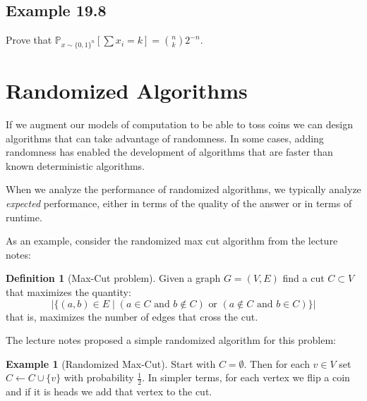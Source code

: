\documentclass[11pt]{article}
\newif\ifsolutions
\theoremstyle{definition}
\newtheorem{defn}[theorem]{Definition}
\newtheorem{example}[theorem]{Example}
\newtheorem*{solution}{Solution}
\begin{document}
\subsection{Example 19.8}
Prove that $\mathbb{P}_{x \sim \{0,1\}^n} [\sum x_i = k] = {{n}\choose{k}} 2^{-n}$.   \\

\ifsolutions
\color{blue}
\begin{solution}
This is simply the probability of getting $k$ heads and $(n-k)$ tails, and since both heads and tails have probability $\frac 1 2$, then we know that this is simply ${{n}\choose{k}} 2^{-n}$.  (There are $\binom n k$ ways to ``choose'' which $k$ of the $n$ coin flips come up heads.)
\end{solution}
\color{black}
\else
\vspace{0.5in}
\fi

\section{Randomized Algorithms}
If we augment our models of computation to be able to toss coins we
can design algorithms that can take advantage of randomness. In some
cases, adding randomness has enabled the development of algorithms
that are faster than known deterministic algorithms.

When we analyze the performance of randomized algorithms, we typically
analyze \emph{expected} performance, either in terms of the quality of
the answer or in terms of runtime.

As an example, consider the randomized max cut algorithm from the lecture
notes:

\begin{defn}[Max-Cut problem]
  Given a graph $G = (V, E)$ find a cut $C \subset V$ that maximizes
  the quantity:
  \[\Big|\big\{(a, b) \in E \;|\; (a \in C \text{ and } b \not\in C) \text{ or } (a \not\in C \text{ and } b \in C)\big\}\Big|\]
  that is, maximizes the number of edges that cross the cut.
\end{defn}

The lecture notes proposed a simple randomized algorithm for this
problem:
\begin{example}[Randomized Max-Cut]
  Start with $C = \emptyset$. Then for each $v \in V$ set
  $C \gets C \cup \{v\}$ with probability $\frac12$. In simpler terms,
  for each vertex we flip a coin and if it is heads we add that vertex
  to the cut.
\end{example}
\end{document}
